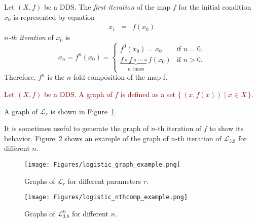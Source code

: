 \begin{definition}
    Let $\left( X, f \right)$ be a DDS. 
    The \emph{first iteration} of the map $f$ for the initial condition $x_0$ is represented by equation
    \begin{eqnarray}
        x_{1}  & = & f(x_{0})
    \end{eqnarray}
    \emph{$n$-th iteration} of $x_0$ is
    \begin{equation}
    x_{n} = f^{n}(x_0) =
        \begin{cases}
            f^{0}(x_0) = x_0 & \text{if } n = 0. \\
            \underbrace{f \circ f \circ \cdots \circ f}_\text{$n$ times}(x_0) & \text{if } n > 0. 
        \end{cases}
    \end{equation}
    Therefore, $f^{n}$ is the $n$-fold composition of the map f.
\end{definition}

\begin{definition}[Graph]
\textcolor{darkred}{
    Let $\left( X, f \right)$ be a DDS. A graph of $f$ is defined as a set $\{\, (x, f(x)) \mid x \in X \,\}$.
}
\end{definition}

\begin{remark}
    A graph of $\mathcal{L}_{r}$ is shown in Figure~\ref{fig:logistic_graph_example}.
    \par
    It is sometimes useful to generate the graph of $n$-th iteration of $f$ to show its behavior.
    Figure~\ref{fig:logistic_nthcomp_example} shows an example of the graph of $n$-th iteration of $\mathcal{L}_{3.8}$ for different $n$.
\end{remark}

\begin{figure}[!h]
    \centering
    \texttt{[image: Figures/logistic\_graph\_example.png]}
    \caption{
        Graphs of $\mathcal{L}_{r}$ for different parameters $r$.
    }
    \label{fig:logistic_graph_example}
\end{figure}

\begin{figure}[!h]
    \centering
    \texttt{[image: Figures/logistic\_nthcomp\_example.png]}
    \caption{
        Graphs of $\mathcal{L}_{3.8}^{n}$ for different $n$.
    }
    \label{fig:logistic_nthcomp_example}
\end{figure}

